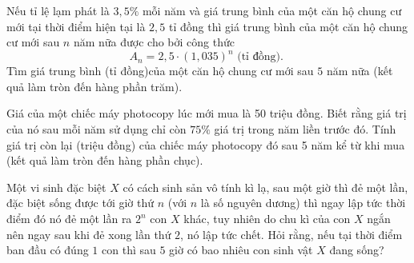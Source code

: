 \begin{ex}
	Nếu tỉ lệ lạm phát là $3,5 \%$ mỗi năm và giá trung bình của một căn hộ chung cư mới tại thời điểm hiện tại là $2,5$ tỉ đồng thì giá trung bình của một căn hộ chung cư mới sau $n$ năm nữa được cho bởi công thức
	$$
	A_{n}=2,5 \cdot(1,035)^{n} \text { (tỉ đồng). }
	$$
	Tìm giá trung bình (tỉ đồng)của một căn hộ chung cư mới sau $5$ năm nữa (kết quả làm tròn đến hàng phần trăm).\\
\end{ex}

\begin{ex}
	Giá của một chiếc máy photocopy lúc mới mua là 50 triệu đồng. Biết rằng giá trị của nó sau mỗi năm sử dụng chỉ còn $75 \%$ giá trị trong năm liền trước đó. Tính giá trị còn lại (triệu đồng) của chiếc máy photocopy đó sau 5 năm kể từ khi mua (kết quả làm tròn đến hàng phần chục).\\
\end{ex}

\begin{ex}
	Một vi sinh đặc biệt $X$ có cách sinh sản vô tính kì lạ, sau một giờ thì đẻ một lần, đặc biệt sống được tới giờ thứ $n$ (với $n$ là số nguyên dương) thì ngay lập tức thời điểm đó nó đẻ một lần ra $2^n$ con $X$ khác, tuy nhiên do chu kì của con $X$ ngắn nên ngay sau khi đẻ xong lần thứ $2$, nó lập tức chết. Hỏi rằng, nếu tại thời điểm ban đầu có đúng $1$ con thì sau $5$ giờ có bao nhiêu con sinh vật $X$ đang sống?\\
\end{ex}

